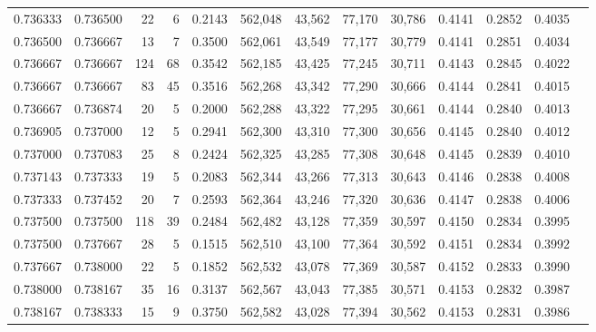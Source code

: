 \begin{tabular}{rrrrrrrrrrrrr}
0.736333 & 0.736500 &    22 &   6 &                                     0.2143 & 562,048 &  43,562 &  77,170 &  30,786 & 0.4141 & 0.2852 & 0.4035 \\
0.736500 & 0.736667 &    13 &   7 &                                     0.3500 & 562,061 &  43,549 &  77,177 &  30,779 & 0.4141 & 0.2851 & 0.4034 \\
0.736667 & 0.736667 &   124 &  68 &                                     0.3542 & 562,185 &  43,425 &  77,245 &  30,711 & 0.4143 & 0.2845 & 0.4022 \\
0.736667 & 0.736667 &    83 &  45 &                                     0.3516 & 562,268 &  43,342 &  77,290 &  30,666 & 0.4144 & 0.2841 & 0.4015 \\
0.736667 & 0.736874 &    20 &   5 &                                     0.2000 & 562,288 &  43,322 &  77,295 &  30,661 & 0.4144 & 0.2840 & 0.4013 \\
0.736905 & 0.737000 &    12 &   5 &                                     0.2941 & 562,300 &  43,310 &  77,300 &  30,656 & 0.4145 & 0.2840 & 0.4012 \\
0.737000 & 0.737083 &    25 &   8 &                                     0.2424 & 562,325 &  43,285 &  77,308 &  30,648 & 0.4145 & 0.2839 & 0.4010 \\
0.737143 & 0.737333 &    19 &   5 &                                     0.2083 & 562,344 &  43,266 &  77,313 &  30,643 & 0.4146 & 0.2838 & 0.4008 \\
0.737333 & 0.737452 &    20 &   7 &                                     0.2593 & 562,364 &  43,246 &  77,320 &  30,636 & 0.4147 & 0.2838 & 0.4006 \\
0.737500 & 0.737500 &   118 &  39 &                                     0.2484 & 562,482 &  43,128 &  77,359 &  30,597 & 0.4150 & 0.2834 & 0.3995 \\
0.737500 & 0.737667 &    28 &   5 &                                     0.1515 & 562,510 &  43,100 &  77,364 &  30,592 & 0.4151 & 0.2834 & 0.3992 \\
0.737667 & 0.738000 &    22 &   5 &                                     0.1852 & 562,532 &  43,078 &  77,369 &  30,587 & 0.4152 & 0.2833 & 0.3990 \\
0.738000 & 0.738167 &    35 &  16 &                                     0.3137 & 562,567 &  43,043 &  77,385 &  30,571 & 0.4153 & 0.2832 & 0.3987 \\
0.738167 & 0.738333 &    15 &   9 &                                     0.3750 & 562,582 &  43,028 &  77,394 &  30,562 & 0.4153 & 0.2831 & 0.3986 \\

\end{tabular}
